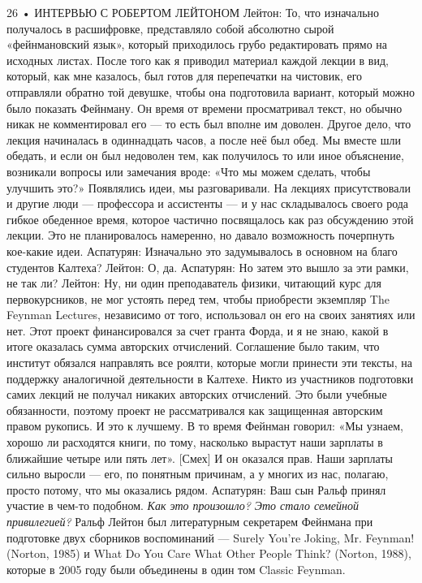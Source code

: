 \documentclass[11pt,oneside]{article}
\begin{document}
26 • ИНТЕРВЬЮ С РОБЕРТОМ ЛЕЙТОНОМ Лейтон: То, что изначально получалось в расшифровке, представляло собой абсолютно сырой «фейнмановский язык», который приходилось грубо редактировать прямо на исходных листах. После того как я приводил материал каждой лекции в вид, который, как мне казалось, был готов для перепечатки на чистовик, его отправляли обратно той девушке, чтобы она подготовила вариант, который можно было показать Фейнману. Он время от времени просматривал текст, но обычно никак не комментировал его --- то есть был вполне им доволен. Другое дело, что лекция начиналась в одиннадцать часов, а после неё был обед. Мы вместе шли обедать, и если он был недоволен тем, как получилось то или иное объяснение, возникали вопросы или замечания вроде: «Что мы можем сделать, чтобы улучшить это?» Появлялись идеи, мы разговаривали. На лекциях присутствовали и другие люди --- профессора и ассистенты --- и у нас складывалось своего рода гибкое обеденное время, которое частично посвящалось как раз обсуждению этой лекции. Это не планировалось намеренно, но давало возможность почерпнуть кое-какие идеи. Аспатурян: Изначально это задумывалось в основном на благо студентов Калтеха? Лейтон: О, да. Аспатурян: Но затем это вышло за эти рамки, не так ли? Лейтон: Ну, ни один преподаватель физики, читающий курс для первокурсников, не мог устоять перед тем, чтобы приобрести экземпляр The Feynman Lectures, независимо от того, использовал он его на своих занятиях или нет. Этот проект финансировался за счет гранта Форда, и я не знаю, какой в итоге оказалась сумма авторских отчислений. Соглашение было таким, что институт обязался направлять все роялти, которые могли принести эти тексты, на поддержку аналогичной деятельности в Калтехе. Никто из участников подготовки самих лекций не получал никаких авторских отчислений. Это были учебные обязанности, поэтому проект не рассматривался как защищенная авторским правом рукопись. И это к лучшему. В то время Фейнман говорил: «Мы узнаем, хорошо ли расходятся книги, по тому, насколько вырастут наши зарплаты в ближайшие четыре или пять лет». [Смех] И он оказался прав. Наши зарплаты сильно выросли --- его, по понятным причинам, а у многих из нас, полагаю, просто потому, что мы оказались рядом. Аспатурян: Ваш сын Ральф принял участие в чем-то подобном.\emph{ Как это произошло? Это стало семейной привилегией? } Ральф Лейтон был литературным секретарем Фейнмана при подготовке двух сборников воспоминаний --- Surely You’re Joking, Mr. Feynman! (Norton, 1985) и What Do You Care What Other People Think? (Norton, 1988), которые в 2005 году были объединены в один том Classic Feynman.\par
\end{document}
